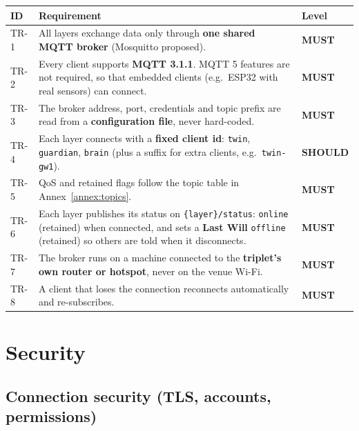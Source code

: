 \documentclass[11pt,a4paper]{article}
\newcommand{\code}[1]{\texttt{#1}}
\newcommand{\MUST}{\textbf{\textcolor{must}{MUST}}}
\newcommand{\SHOULD}{\textbf{\textcolor{should}{SHOULD}}}
\begin{document}
\begin{longtable}{@{}l p{10.9cm} l@{}}
\toprule
\textbf{ID} & \textbf{Requirement} & \textbf{Level} \\
\midrule
\endhead
TR-1 & All layers exchange data only through \textbf{one shared MQTT broker} (Mosquitto proposed). & \MUST \\
TR-2 & Every client supports \textbf{MQTT 3.1.1}. MQTT 5 features are not required, so that embedded clients (e.g.\ ESP32 with real sensors) can connect. & \MUST \\
TR-3 & The broker address, port, credentials and topic prefix are read from a \textbf{configuration file}, never hard-coded. & \MUST \\
TR-4 & Each layer connects with a \textbf{fixed client id}: \code{twin}, \code{guardian}, \code{brain} (plus a suffix for extra clients, e.g.\ \code{twin-gw1}). & \SHOULD \\
TR-5 & QoS and retained flags follow the topic table in Annex~\ref{annex:topics}. & \MUST \\
TR-6 & Each layer publishes its status on \code{\{layer\}/status}: \code{online} (retained) when connected, and sets a \textbf{Last Will} \code{offline} (retained) so others are told when it disconnects. & \MUST \\
TR-7 & The broker runs on a machine connected to the \textbf{triplet's own router or hotspot}, never on the venue Wi-Fi. & \MUST \\
TR-8 & A client that loses the connection reconnects automatically and re-subscribes. & \MUST \\
\bottomrule
\end{longtable}

\section{Security}

\subsection{Connection security (TLS, accounts, permissions)}
\end{document}
